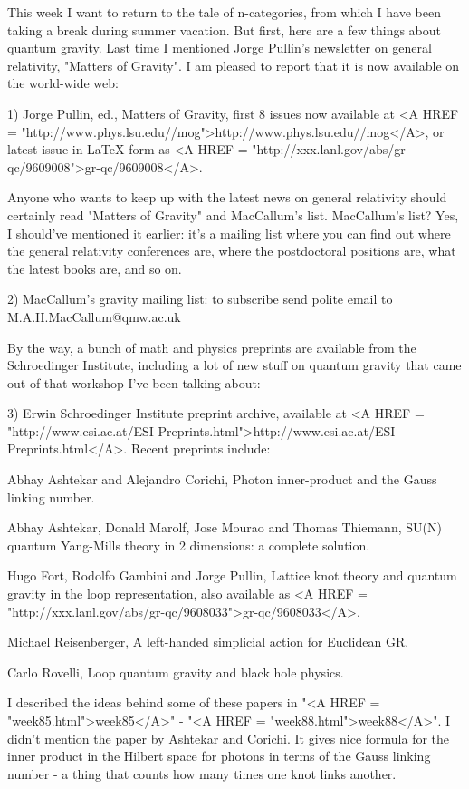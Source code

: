 

This week I want to return to the tale of n-categories, from which I have
been taking a break during summer vacation.  But first, here are a
few things about quantum gravity.   Last time I mentioned Jorge Pullin's
newsletter on general relativity, "Matters of Gravity".  
I am pleased to report that it is now available on the world-wide web:

1) Jorge Pullin, ed., Matters of Gravity, first 8 issues now available at
<A HREF = "http://www.phys.lsu.edu//mog">http://www.phys.lsu.edu//mog</A>, 
or latest issue in LaTeX form as 
<A HREF = "http://xxx.lanl.gov/abs/gr-qc/9609008">gr-qc/9609008</A>.

Anyone who wants to keep up with the latest news on general relativity
should certainly read "Matters of Gravity" and MacCallum's list. 
MacCallum's list?  Yes, I should've mentioned it earlier: it's a
mailing list where you can find out where the general relativity
conferences are, where the postdoctoral positions are, what the latest
books are, and so on.

2) MacCallum's gravity mailing list: to subscribe send polite
email to M.A.H.MacCallum@qmw.ac.uk

By the way, a bunch of math and physics preprints are available from the
Schroedinger Institute, including a lot of new stuff on quantum gravity
that came out of that workshop I've been talking about:

3) Erwin Schroedinger Institute preprint archive, available at
<A HREF = "http://www.esi.ac.at/ESI-Preprints.html">http://www.esi.ac.at/ESI-Preprints.html</A>.  Recent preprints include:

Abhay Ashtekar and Alejandro Corichi, Photon inner-product and the Gauss
linking number.

Abhay Ashtekar, Donald Marolf, Jose Mourao and Thomas Thiemann, SU(N)
quantum Yang-Mills theory in 2 dimensions: a complete solution.

Hugo Fort, Rodolfo Gambini and Jorge Pullin, Lattice knot theory and
quantum gravity in the loop representation, also available as
<A HREF = "http://xxx.lanl.gov/abs/gr-qc/9608033">gr-qc/9608033</A>.

Michael Reisenberger, A left-handed simplicial action for Euclidean GR.

Carlo Rovelli, Loop quantum gravity and black hole physics.

I described the ideas behind some of these papers in "<A HREF = "week85.html">week85</A>" -
"<A HREF = "week88.html">week88</A>".  I didn't mention the paper by Ashtekar and Corichi.  It gives
nice formula for the inner product in the Hilbert space for photons in
terms of the Gauss linking number - a thing that counts how many times
one knot links another.  


